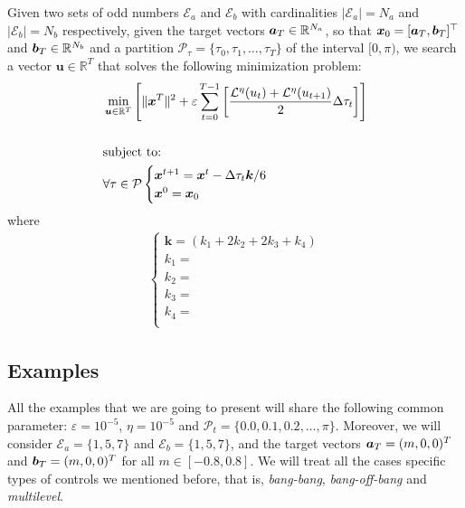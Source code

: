 \documentclass[twocolumn]{autart}    %
\begin{document}
\begin{problem}\label{pb:numOCP2}
Given two sets of odd numbers $\mathcal{E}_a$ and $\mathcal{E}_b$ with cardinalities $|\mathcal{E}_a| = N_a$ and $|\mathcal{E}_b| = N_b$ respectively, given the target vectors $\bm{a}_T  \in \mathbb{R}^{N_a}$, so that $\bm{x}_0 = [\bm{a}_T,\bm{b}_T]^\top$ and $\bm{b}_T \in \mathbb{R}^{N_b}$ and a partition $\mathcal{P}_\tau = \{\tau_0,\tau_1,\dots,\tau_{T}\}$ of the interval $[0,\pi)$, we search a vector $\bm{u} \in \mathbb{R}^{T}$ that solves the following minimization problem:
\begin{align*}
	&\min_{\bm{u} \in \mathbb{R}^T} \Bigg[\| \bm{x}^T\|^2 + \varepsilon \sum_{t=0}^{T-1} \bigg[\frac{\mathcal{L}^\eta(u_{t}) + \mathcal{L}^\eta(u_{t+1})}{2}\Delta\tau_t \bigg]  \Bigg]  
	\\[15pt]
    &\notag \text{subject to: } 
    \\
    &\forall \tau \in \mathcal{P} \begin{cases}
    \bm{x}^{t+1} = \bm{x}^{t} - \Delta \tau_t\bm{k} /6\\
    \bm{x}^0 = \bm{x}_0
    \end{cases} 
\end{align*}
where 
\begin{gather}
	\begin{cases}
		\bm{k} = (k_1 + 2k_2 + 2k_3 + k_4) \\ 
		k_1 =  \\
		k_2 =  \\
		k_3 =  \\
		k_4 =  \\
	\end{cases}
\end{gather}
\end{problem}

\subsection{Examples}

All the examples that we are going to present will share the following common parameter: $\varepsilon = 10^{-5}$, $\eta = 10^{-5}$ and $\mathcal{P}_t = \{0.0 , 0.1, 0.2 ,\dots,\pi\}$. Moreover, we will consider $\mathcal{E}_a = \{1,5,7\}$ and  $\mathcal{E}_b = \{1,5,7\}$, and the target vectors $\bm{a}_T = (m,0,0)^T$ and $\bm{b}_T = (m,0,0)^T$ for all $m \in [-0.8,0.8]$. We will treat all the cases specific types of controls we mentioned before, that is, \emph{bang-bang}, \emph{bang-off-bang} and \textit{multilevel}. 
\end{document}
